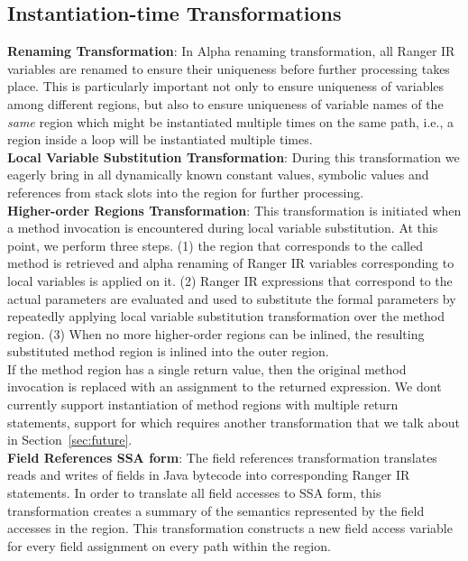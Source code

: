 \subsection{Instantiation-time Transformations}
\label{sec:instantiationTransformations}

\textbf{Renaming Transformation}: In Alpha renaming transformation, all Ranger IR variables are renamed to ensure their uniqueness before further processing takes place. 
%
This is particularly important not only to ensure uniqueness of variables among different regions, but also to ensure
uniqueness of variable names of the \textit{same} region which might be instantiated multiple times on the same path,
i.e., a region inside a loop will be instantiated multiple times.\\
%
\textbf{Local Variable Substitution Transformation}: During this transformation we eagerly bring in all dynamically
known constant values, symbolic values and references from stack slots into the region for further processing. \\
%
\textbf{Higher-order Regions Transformation}: This transformation is initiated when a method invocation is encountered
during local variable substitution.
%
At this point, we perform three steps.
%
(1) the region that corresponds to the called method is retrieved and alpha renaming of
Ranger IR variables corresponding to local variables is applied on it.
%
(2) Ranger IR expressions that correspond to the actual parameters are evaluated and used to substitute the formal
parameters by repeatedly applying local variable substitution transformation over the method region.
%
(3) When no more higher-order regions can be inlined, the resulting substituted method region is inlined into
the outer region.\\
%
If the method region has a single return value, then the original method invocation is replaced with an assignment to
the returned expression.
%
%
We dont currently support instantiation of method regions with multiple return statements, support for which requires
another transformation that we talk about in Section~\ref{sec:future}.
\\
\textbf{Field References SSA form}: The field references transformation translates reads and writes of fields
in Java bytecode into corresponding Ranger IR statements.
%
In order to translate all field accesses to SSA form, this transformation creates a summary of the semantics
represented by the field accesses in the region.
%
This transformation constructs a new field access variable for every field assignment on every path within the region.
